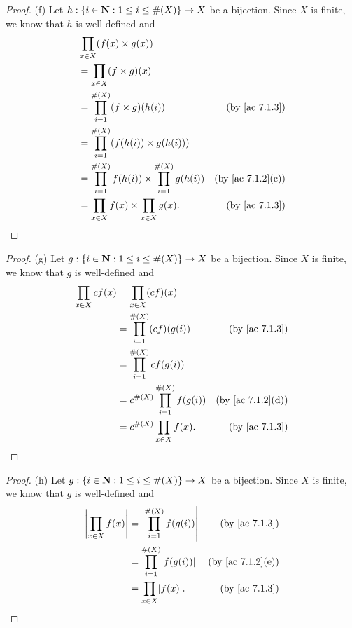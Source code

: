 \begin{proof}{(f)}
  Let \(h : \{i \in \mathbf{N} : 1 \leq i \leq \#(X)\} \to X\) be a bijection.
  Since \(X\) is finite, we know that \(h\) is well-defined and
  \begin{align*}
     & \prod_{x \in X} (f(x) \times g(x))                                                                    \\
     & = \prod_{x \in X} (f \times g)(x)                                                                     \\
     & = \prod_{i = 1}^{\#(X)} (f \times g)(h(i))                           & \text{(by \cref{ac 7.1.3})}    \\
     & = \prod_{i = 1}^{\#(X)} (f(h(i)) \times g(h(i)))                                                      \\
     & = \prod_{i = 1}^{\#(X)} f(h(i)) \times \prod_{i = 1}^{\#(X)} g(h(i)) & \text{(by \cref{ac 7.1.2}(c))} \\
     & = \prod_{x \in X} f(x) \times \prod_{x \in X} g(x).                  & \text{(by \cref{ac 7.1.3})}
  \end{align*}
\end{proof}

\begin{proof}{(g)}
  Let \(g : \{i \in \mathbf{N} : 1 \leq i \leq \#(X)\} \to X\) be a bijection.
  Since \(X\) is finite, we know that \(g\) is well-defined and
  \begin{align*}
    \prod_{x \in X} cf(x) & = \prod_{x \in X} (cf)(x)                                                  \\
                          & = \prod_{i = 1}^{\#(X)} (cf)(g(i))        & \text{(by \cref{ac 7.1.3})}    \\
                          & = \prod_{i = 1}^{\#(X)} cf(g(i))                                           \\
                          & = c^{\#(X)} \prod_{i = 1}^{\#(X)} f(g(i)) & \text{(by \cref{ac 7.1.2}(d))} \\
                          & = c^{\#(X)} \prod_{x \in X} f(x).         & \text{(by \cref{ac 7.1.3})}
  \end{align*}
\end{proof}

\begin{proof}{(h)}
  Let \(g : \{i \in \mathbf{N} : 1 \leq i \leq \#(X)\} \to X\) be a bijection.
  Since \(X\) is finite, we know that \(g\) is well-defined and
  \begin{align*}
    \abs{\prod_{x \in X} f(x)} & = \abs{\prod_{i = 1}^{\#(X)} f(g(i))} & \text{(by \cref{ac 7.1.3})}    \\
                               & = \prod_{i = 1}^{\#(X)} \abs{f(g(i))} & \text{(by \cref{ac 7.1.2}(e))} \\
                               & = \prod_{x \in X} \abs{f(x)}.         & \text{(by \cref{ac 7.1.3})}
  \end{align*}
\end{proof}

